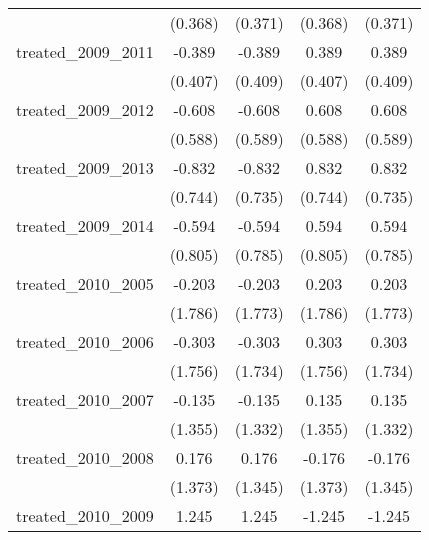 {\begin{tabular}{l*{4}{c}}
            &     (0.368)         &     (0.371)         &     (0.368)         &     (0.371)         \\
[1em]
treated\_2009\_2011&      -0.389         &      -0.389         &       0.389         &       0.389         \\
            &     (0.407)         &     (0.409)         &     (0.407)         &     (0.409)         \\
[1em]
treated\_2009\_2012&      -0.608         &      -0.608         &       0.608         &       0.608         \\
            &     (0.588)         &     (0.589)         &     (0.588)         &     (0.589)         \\
[1em]
treated\_2009\_2013&      -0.832         &      -0.832         &       0.832         &       0.832         \\
            &     (0.744)         &     (0.735)         &     (0.744)         &     (0.735)         \\
[1em]
treated\_2009\_2014&      -0.594         &      -0.594         &       0.594         &       0.594         \\
            &     (0.805)         &     (0.785)         &     (0.805)         &     (0.785)         \\
[1em]
treated\_2010\_2005&      -0.203         &      -0.203         &       0.203         &       0.203         \\
            &     (1.786)         &     (1.773)         &     (1.786)         &     (1.773)         \\
[1em]
treated\_2010\_2006&      -0.303         &      -0.303         &       0.303         &       0.303         \\
            &     (1.756)         &     (1.734)         &     (1.756)         &     (1.734)         \\
[1em]
treated\_2010\_2007&      -0.135         &      -0.135         &       0.135         &       0.135         \\
            &     (1.355)         &     (1.332)         &     (1.355)         &     (1.332)         \\
[1em]
treated\_2010\_2008&       0.176         &       0.176         &      -0.176         &      -0.176         \\
            &     (1.373)         &     (1.345)         &     (1.373)         &     (1.345)         \\
[1em]
treated\_2010\_2009&       1.245\sym{*}  &       1.245\sym{*}  &      -1.245\sym{*}  &      -1.245\sym{*}  \\

\end{tabular}}
